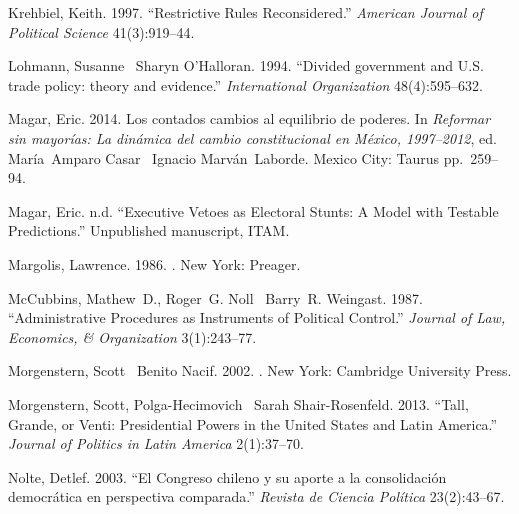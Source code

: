\documentclass[letter,12pt]{article}
\begin{document}
\begin{thebibliography}{xx}
Krehbiel, Keith. 1997.
\newblock ``Restrictive Rules Reconsidered.'' {\em American Journal of
  Political Science} 41(3):919--44.

Lohmann, Susanne \harvardand\ Sharyn O'Halloran. 1994.
\newblock ``Divided government and U.S. trade policy: theory and evidence.''
  {\em International Organization} 48(4):595--632.

Magar, Eric. 2014.
\newblock Los contados cambios al equilibrio de poderes.  In {\em Reformar sin
  mayor\'ias: La din\'amica del cambio constitucional en {M}\'exico,
  1997--2012}, ed. Mar\'ia~Amparo Casar \harvardand\ Ignacio Marv\'an~Laborde.
\newblock Mexico City:  Taurus pp.~259--94.

Magar, Eric. n.d.
\newblock ``Executive Vetoes as Electoral Stunts: A Model with Testable
  Predictions.'' Unpublished manuscript, ITAM.

Margolis, Lawrence. 1986.
.
\newblock New York:  Preager.

McCubbins, Mathew~D., Roger~G. Noll \harvardand\ Barry~R. Weingast. 1987.
\newblock ``Administrative Procedures as Instruments of Political Control.''
  {\em Journal of Law, Economics, \& Organization} 3(1):243--77.

Morgenstern, Scott \harvardand\ Benito Nacif. 2002.
.
\newblock New York:  Cambridge University Press.

Morgenstern, Scott, Polga-Hecimovich \harvardand\ Sarah Shair-Rosenfeld. 2013.
\newblock ``Tall, Grande, or Venti: Presidential Powers in the United States
  and Latin America.'' {\em Journal of Politics in Latin America} 2(1):37--70.

\harvarditem{Nolte}{2003}{nolte.2003}
Nolte, Detlef. 2003.
\newblock ``El Congreso chileno y su aporte a la consolidaci\'on democr\'atica
  en perspectiva comparada.'' {\em Revista de Ciencia Pol\'itica} 23(2):43--67.


\end{thebibliography}
\end{document}
